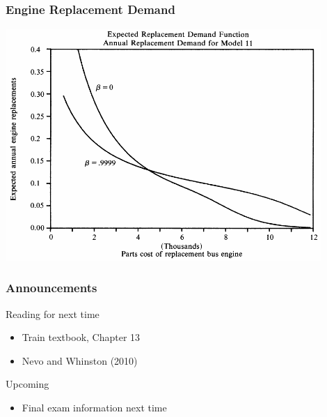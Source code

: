 \documentclass{beamer}
\begin{document}
\begin{frame}\frametitle{Engine Replacement Demand}
    \centering
    \includegraphics[width=0.9\textwidth]{demand.png}
\end{frame}

\begin{frame}\frametitle{Announcements}
    Reading for next time
    \begin{itemize}
        \item Train textbook, Chapter 13
         \item Nevo and Whinston (2010)
    \end{itemize}
    \vspace{3ex}
    Upcoming
    \begin{itemize}
        \item Final exam information next time
    \end{itemize}
\end{frame}
\end{document}
